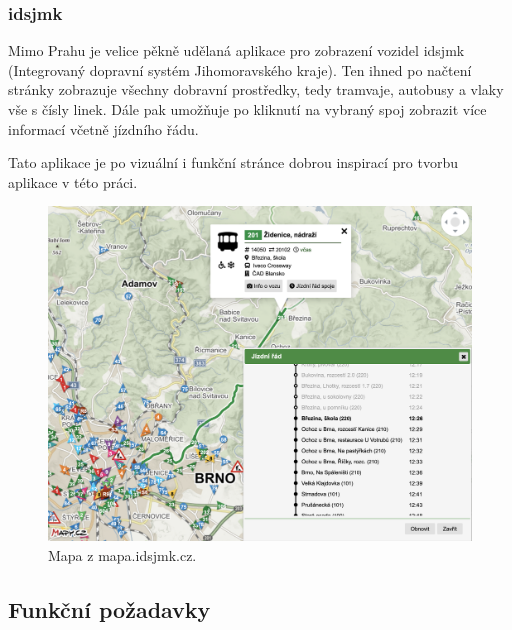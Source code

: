 \subsubsection{\gls{idsjmk}}

Mimo Prahu je velice pěkně udělaná aplikace pro zobrazení vozidel \gls{idsjmk} (Integrovaný dopravní systém Jihomoravského kraje). Ten ihned po načtení stránky zobrazuje všechny dobravní prostředky, tedy tramvaje, autobusy a vlaky vše s čísly linek. Dále pak umožňuje po kliknutí na vybraný spoj zobrazit více informací včetně jízdního řádu.

\bigbreak

Tato aplikace je po vizuální i funkční stránce dobrou inspirací pro tvorbu aplikace v této práci.

\begin{figure}
  \includegraphics[width=\linewidth]{../img/idsjmk_mapa.png}
  \caption{Mapa z mapa.idsjmk.cz.}
  \label{fig:idsjmk_result}
\end{figure}

\subsection{Funkční požadavky}

